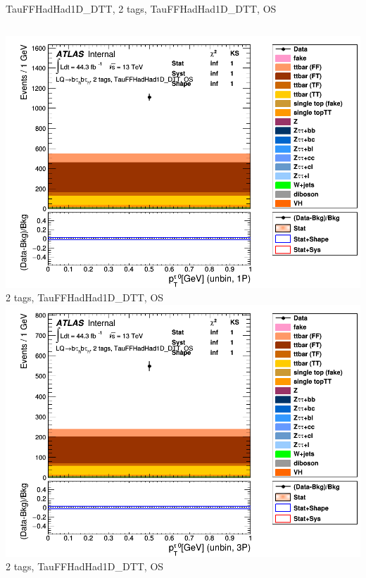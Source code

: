 \begin{frame}{TauFFHadHad1D\_DTT, 2 tags, TauFFHadHad1D\_DTT, OS}
\begin{columns}[c]
    \centering\includegraphics[width=\textwidth]{C_2tag2pjet_0ptv_OS_UnbinLeadTau1P}\\
    2 tags, TauFFHadHad1D\_DTT, OS
    \centering\includegraphics[width=\textwidth]{C_2tag2pjet_0ptv_OS_UnbinLeadTau3P}\\
    2 tags, TauFFHadHad1D\_DTT, OS
  \end{columns}
\end{frame}

